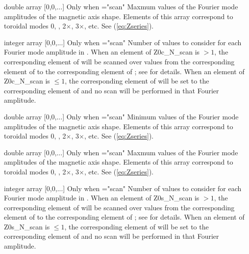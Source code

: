 \myhrule

{double array}
{[0,0,...]}
{Only when ={\ttfamily "scan"}}
{Maxmum values of the Fourier mode amplitudes of the magnetic axis shape. Elements of this array correspond to toroidal modes 0, , 2$\times$, 3$\times$, etc.  See (\ref{eq:Zseries}).
}

\myhrule

{integer array}
{[0,0,...]}
{Only when ={\ttfamily "scan"}}
{Number of values to consider for each Fourier mode amplitude in . When an element of {\ttfamily Z0c\_N\_scan} is $>1$, the corresponding element of  will be scanned over  values from the corresponding element of  to the corresponding element of ; see  for details.  When an element of {\ttfamily Z0c\_N\_scan} is $\le 1$, the corresponding element of  will be set to the corresponding element of  and no scan will be performed in that Fourier amplitude.
}

\myhrule

{double array}
{[0,0,...]}
{Only when ={\ttfamily "scan"}}
{Minimum values of the Fourier mode amplitudes of the magnetic axis shape. Elements of this array correspond to toroidal modes 0, , 2$\times$, 3$\times$, etc.  See (\ref{eq:Zseries}).
}

\myhrule

{double array}
{[0,0,...]}
{Only when ={\ttfamily "scan"}}
{Maxmum values of the Fourier mode amplitudes of the magnetic axis shape. Elements of this array correspond to toroidal modes 0, , 2$\times$, 3$\times$, etc.  See (\ref{eq:Zseries}).
}

\myhrule

{integer array}
{[0,0,...]}
{Only when ={\ttfamily "scan"}}
{Number of values to consider for each Fourier mode amplitude in . When an element of {\ttfamily Z0s\_N\_scan} is $>1$, the corresponding element of  will be scanned over  values from the corresponding element of  to the corresponding element of ; see  for details.  When an element of {\ttfamily Z0s\_N\_scan} is $\le 1$, the corresponding element of  will be set to the corresponding element of  and no scan will be performed in that Fourier amplitude.
}

